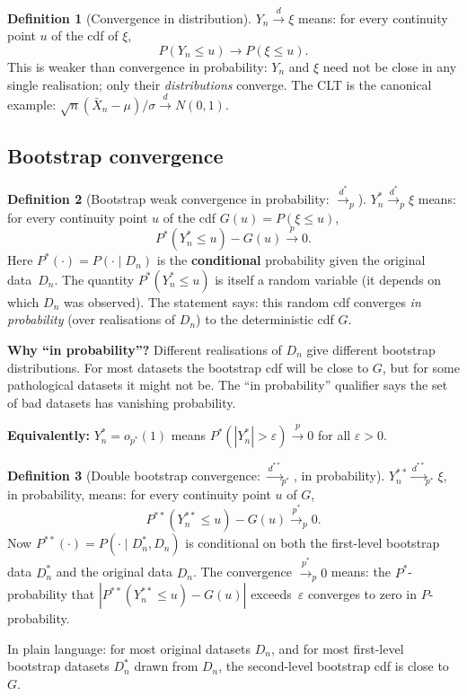 \documentclass[11pt]{article}
\theoremstyle{definition}
\newtheorem*{definition}{Definition}
\begin{document}
\begin{definition}[Convergence in distribution]
  $Y_n \xrightarrow{d} \xi$ means: for every continuity point $u$ of
  the cdf of $\xi$,
  \[
    P(Y_n \le u) \to P(\xi \le u).
  \]
  This is weaker than convergence in probability: $Y_n$ and $\xi$ need not
  be close in any single realisation; only their \textit{distributions}
  converge. The CLT is the canonical example:
  $\sqrt{n}(\bar X_n - \mu)/\sigma \xrightarrow{d} N(0,1)$.
\end{definition}
 
\subsection{Bootstrap convergence}
 
\begin{definition}[Bootstrap weak convergence in probability: $\xrightarrow{d^*}_p$]
  $Y_n^* \xrightarrow{d^*}_p \xi$ means: for every continuity point $u$ of
  the cdf $G(u) = P(\xi \le u)$,
  \[
    P^*(Y_n^* \le u) - G(u) \xrightarrow{p} 0.
  \]
  Here $P^*(\cdot) = P(\cdot \mid D_n)$ is the \textbf{conditional}
  probability given the original data~$D_n$. The quantity
  $P^*(Y_n^* \le u)$ is itself a random variable (it depends on which
  $D_n$ was observed). The statement says: this random cdf converges
  \textit{in probability} (over realisations of $D_n$) to the
  deterministic cdf $G$.
 
  \medskip
 
  \textbf{Why ``in probability''?}
  Different realisations of $D_n$ give different bootstrap distributions.
  For most datasets the bootstrap cdf will be close to $G$, but for some
  pathological datasets it might not be. The ``in probability'' qualifier
  says the set of bad datasets has vanishing probability.
 
  \medskip
 
  \textbf{Equivalently:} $Y_n^* = o_{p^*}(1)$ means
  $P^*(|Y_n^*| > \varepsilon) \xrightarrow{p} 0$ for all $\varepsilon > 0$.
\end{definition}
 
\begin{definition}[Double bootstrap convergence: $\xrightarrow{d^{**}}_{p^*}$, in probability]
  $Y_n^{**} \xrightarrow{d^{**}}_{p^*} \xi$, in probability, means: for
  every continuity point $u$ of $G$,
  \[
    P^{**}(Y_n^{**} \le u) - G(u) \xrightarrow{p^*}_p 0.
  \]
  Now $P^{**}(\cdot) = P(\cdot \mid D_n^*, D_n)$ is conditional on both
  the first-level bootstrap data $D_n^*$ and the original data $D_n$.
  The convergence $\xrightarrow{p^*}_p 0$ means: the $P^*$-probability
  that $|P^{**}(Y_n^{**} \le u) - G(u)|$ exceeds~$\varepsilon$ converges
  to zero in $P$-probability.
 
  \medskip
 
  In plain language: for most original datasets $D_n$, and for most
  first-level bootstrap datasets $D_n^*$ drawn from $D_n$, the
  second-level bootstrap cdf is close to $G$.
\end{definition}
 
\end{document}
